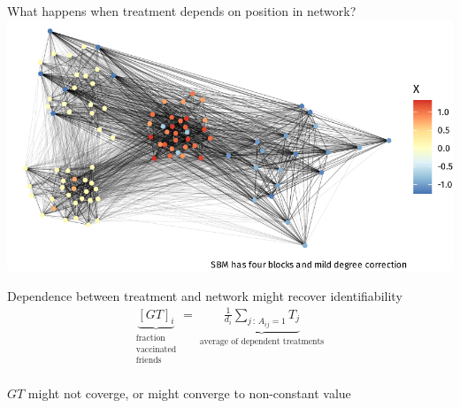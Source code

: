\documentclass[aspectratio=169]{beamer}
\theoremstyle{remark}
\begin{document}
\begin{frame}{What happens when treatment depends on position in network?}
    \centering
    \includegraphics{./figures/simulations/defense-backbone-dependent.pdf}
\end{frame}

\begin{frame}{Dependence between treatment and network might recover identifiability}
    \Large
    \begin{align*}
        \underbrace{[GT]_i}_{\substack{\text{fraction} \\ \text{vaccinated} \\ \text{friends}}}
        = \underbrace{
            \frac{1}{d_i} \sum_{j \, : \, A_{ij} = 1} T_j
        }_{\substack{\text{average of dependent treatments}}}
    \end{align*} \\
    \normalsize
    \centering
    \vspace{8mm}
    $GT$ might not coverge, or might converge to non-constant value
\end{frame}
\end{document}
